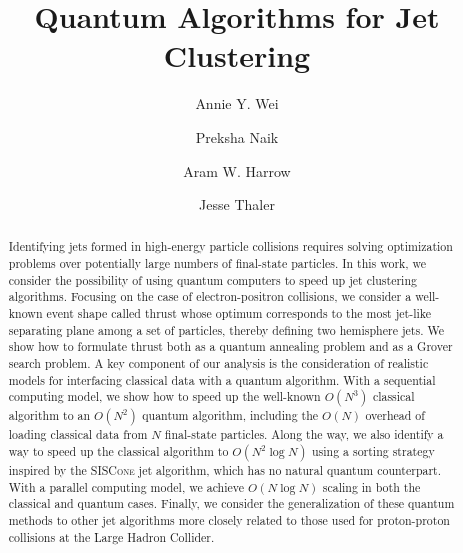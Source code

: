 \documentclass[aps,prd,twocolumn,superscriptaddress,preprintnumbers,nofootinbib,longbibliography,floatfix]{revtex4-1}
\begin{document}
%
%


\title{Quantum Algorithms for Jet Clustering}

\author{Annie Y. Wei}

\author{Preksha Naik}

\author{Aram W. Harrow}

\author{Jesse Thaler}

\begin{abstract}
%
Identifying jets formed in high-energy particle collisions requires solving optimization problems over potentially large numbers of final-state particles.
%
In this work, we consider the possibility of using quantum computers to speed up jet clustering algorithms.
%
Focusing on the case of electron-positron collisions, we consider a well-known event shape called thrust whose optimum corresponds to the most jet-like separating plane among a set of particles, thereby defining two hemisphere jets.
%
We show how to formulate thrust both as a quantum annealing problem and as a Grover search problem.
%
A key component of our analysis is the consideration of realistic models for interfacing classical data with a quantum algorithm.
%
With a sequential computing model, we show how to speed up the well-known $O(N^3)$ classical algorithm to an $O(N^2)$ quantum algorithm, including the $O(N)$ overhead of loading classical data from $N$ final-state particles.
%
Along the way, we also identify a way to speed up the classical algorithm to $O(N^2 \log N)$ using a sorting strategy inspired by the \textsc{SISCone} jet algorithm, which has no natural quantum counterpart.
%
With a parallel computing model, we achieve $O(N \log N)$ scaling in both the classical and quantum cases.
%
Finally, we consider the generalization of these quantum methods to other jet algorithms more closely related to those used for proton-proton collisions at the Large Hadron Collider.
%
\end{abstract}
\end{document}
